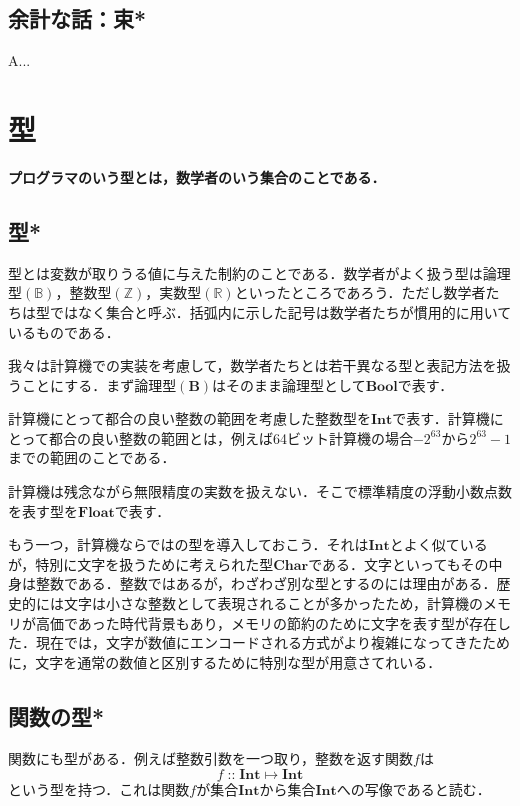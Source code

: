 \documentclass[twocolumn]{jsbook}
\newenvironment{leader}{\begingroup\bf}{\endgroup}
\newcommand{\hsklType}[1]{\textbf{#1}}
\newcommand{\hsklBool}{\hsklType{Bool}}
\newcommand{\hsklChar}{\hsklType{Char}}
\newcommand{\hsklInt}{\hsklType{Int}}
\newcommand{\hsklFloat}{\hsklType{Float}}
\DeclareMathOperator{\mathIn}{::}
\DeclareMathOperator{\mathMapsTo}{\mapsto}
\newcommand{\mathSet}[1]{\mathbf{#1}}
\newcommand{\mathSpecialSet}[1]{\mathbb{#1}}
\newcommand{\mathMorph}[2]{#1\mathMapsTo#2}
\begin{document}
\section{余計な話：束*}

A...

\chapter{型}


\begin{leader}
プログラマのいう型とは，数学者のいう集合のことである．
\end{leader}


\section{型*}

型とは変数が取りうる値に与えた制約のことである．数学者がよく扱う型は論理型$(\mathSpecialSet{B})$，整数型$(\mathSpecialSet{Z})$，実数型$(\mathSpecialSet{R})$といったところであろう．ただし数学者たちは型ではなく集合と呼ぶ．括弧内に示した記号は数学者たちが慣用的に用いているものである．

我々は計算機での実装を考慮して，数学者たちとは若干異なる型と表記方法を扱うことにする．まず論理型$(\mathSet{B})$はそのまま論理型として$\hsklBool$で表す．

計算機にとって都合の良い整数の範囲を考慮した整数型を$\hsklInt$で表す．計算機にとって都合の良い整数の範囲とは，例えば64ビット計算機の場合$-2^{63}$から$2^{63}-1$までの範囲のことである．

計算機は残念ながら無限精度の実数を扱えない．そこで標準精度の浮動小数点数を表す型を$\hsklFloat$で表す．

もう一つ，計算機ならではの型を導入しておこう．それは$\hsklInt$とよく似ているが，特別に文字を扱うために考えられた型$\hsklChar$である．文字といってもその中身は整数である．整数ではあるが，わざわざ別な型とするのには理由がある．歴史的には文字は小さな整数として表現されることが多かったため，計算機のメモリが高価であった時代背景もあり，メモリの節約のために文字を表す型が存在した．現在では，文字が数値にエンコードされる方式がより複雑になってきたために，文字を通常の数値と区別するために特別な型が用意さてれいる．

\section{関数の型*}

関数にも型がある．例えば整数引数を一つ取り，整数を返す関数$f$は$$f\mathIn\mathMorph{\hsklInt}{\hsklInt}$$という型を持つ．これは関数$f$が集合$\hsklInt$から集合$\hsklInt$への写像であると読む．
\end{document}
